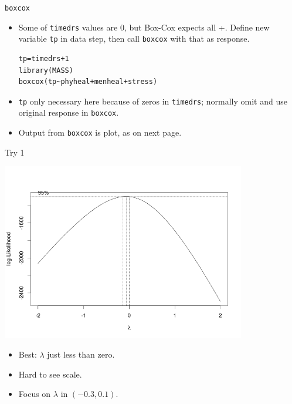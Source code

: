 \documentclass{beamer}
\begin{document}
\begin{frame}[fragile]{\texttt{boxcox}}
  \begin{itemize}
  \item Some of \verb-timedrs- values are 0, but Box-Cox expects all
    +. Define new variable \verb-tp- in data step, then call
    \verb-boxcox- with that as response.

\begin{verbatim}
tp=timedrs+1
library(MASS)
boxcox(tp~phyheal+menheal+stress)
\end{verbatim}


  \item \verb-tp- only necessary here because of zeros in
    \verb-timedrs-; normally omit and use original response in
    \verb-boxcox-.
  \item Output from \texttt{boxcox} is plot, as on next page.

\end{itemize}

\end{frame}

\begin{frame}[fragile]{Try 1}

\includegraphics[width=0.8\textwidth]{boxcox}
\begin{itemize}
\item Best: $\lambda$ just less than zero.
\item Hard to see scale. 
\item Focus on $\lambda$ in $(-0.3,0.1)$.

\end{itemize}

\end{frame}
\end{document}
